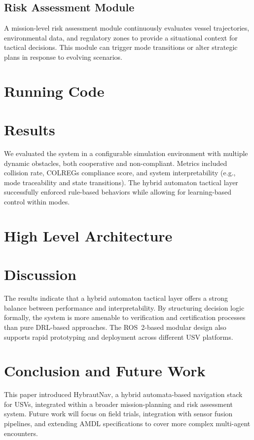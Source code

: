 \documentclass{article}
\begin{document}
\subsection{Risk Assessment Module}
A mission-level risk assessment module continuously evaluates vessel trajectories, environmental data, and regulatory zones to provide a situational context for tactical decisions. This module can trigger mode transitions or alter strategic plans in response to evolving scenarios.


\section{Running Code}


\section{Results}
We evaluated the system in a configurable simulation environment with multiple dynamic obstacles, both cooperative and non-compliant. Metrics included collision rate, COLREGs compliance score, and system interpretability (e.g., mode traceability and state transitions). The hybrid automaton tactical layer successfully enforced rule-based behaviors while allowing for learning-based control within modes.

\section{High Level Architecture}


\section{Discussion}
The results indicate that a hybrid automaton tactical layer offers a strong balance between performance and interpretability. By structuring decision logic formally, the system is more amenable to verification and certification processes than pure DRL-based approaches. The ROS~2-based modular design also supports rapid prototyping and deployment across different USV platforms.

\section{Conclusion and Future Work}
This paper introduced HybrautNav, a hybrid automata-based navigation stack for USVs, integrated within a broader mission-planning and risk assessment system. Future work will focus on field trials, integration with sensor fusion pipelines, and extending AMDL specifications to cover more complex multi-agent encounters.



\end{document}
